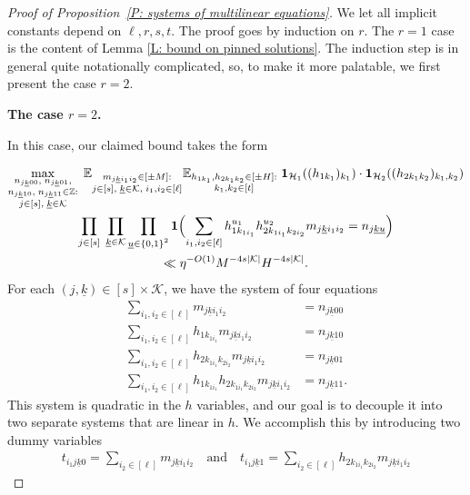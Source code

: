 \documentclass[10pt,a4paper]{amsart}
\newcommand{\Bigbrac}[1]{\Bigl( #1 \Bigr)}
\newcommand{\CH}{{\mathcal H}}
\newcommand{\CK}{{\mathcal K}}
\newcommand{\E}{{\mathbb E}}
\newcommand{\Z}{{\mathbb Z}}
\newcommand{\uk}{{\underline{k}}}
\newcommand{\uu}{{\underline{u}}}
\begin{document}
\begin{proof}[Proof of Proposition~\ref{P: systems of multilinear equations}] We let all implicit constants depend on $\ell, r, s, t$. The proof goes by induction on $r$.  The $r=1$ case is the content of Lemma \ref{L: bound on pinned solutions}.  The induction step is in general quite notationally complicated, so, to make it more palatable, we first present the case $r=2$.

\smallskip
\textbf{The case $r=2$.}
\smallskip

In this case, our claimed bound takes the form

        \begin{multline*}
        \max_{\substack{n_{j\uk00},\; n_{j\uk01},\\ n_{j\uk10},\; n_{j\uk11}\in\Z:\\ j\in[s],\; \uk\in\CK}}\;\E_{\substack{m_{j\uk i_1 i_2}\in[\pm M]:\\ j\in[s],\; \uk\in\CK,\; i_1, i_2\in[\ell]}}
                \E_{\substack{h_{1k_1}, h_{2k_1k_2}\in[\pm H]:\\ k_1, k_2\in[t]}}\; \mathbf{1}_{\CH_1}((h_{1k_1})_{k_1}) \cdot \mathbf{1}_{\CH_2}((h_{2k_1k_2})_{k_1, k_2})\\
        \prod_{j\in[s]}\; \prod_{\substack{\uk\in\CK}}\prod_{\substack{\uu\in\{0,1\}^2
        }} \mathbf{1}\Bigbrac{\sum\limits_{i_1, i_2\in[\ell]} h_{1k_{1i_1}}^{u_1} h_{2k_{1i_1}k_{2i_2}}^{u_2}m_{j\uk i_1 i_2} = n_{j\uk\uu}}\\
        \ll \eta^{-O(1)}  M^{-4s|\CK|} H^{-4s|\CK|}.
    \end{multline*}
    For each $(j,\uk)\in[s]\times \CK$, we have the system of four equations
\begin{align*}
    \sum\limits_{i_1, i_2\in[\ell]} m_{j\uk i_1 i_2} &= n_{j\uk00}\\
    \sum\limits_{i_1, i_2\in[\ell]} h_{1k_{1i_1}} m_{j\uk i_1 i_2} &= n_{j\uk10}\\
    \sum\limits_{i_1, i_2\in[\ell]} h_{2k_{1i_1}k_{2i_2}} m_{j\uk i_1 i_2} &= n_{j\uk01}\\
    \sum\limits_{i_1, i_2\in[\ell]} h_{1k_{1i_1}} h_{2k_{1i_1}k_{2i_2}} m_{j\uk i_1 i_2} &= n_{j\uk11}.
\end{align*}
This system is quadratic in the $h$ variables, and our goal is to decouple it into two separate systems that are linear in $h$. We accomplish this by introducing two dummy variables
\begin{align*}
    t_{i_1 j \uk 0} = \sum_{i_2\in[\ell]}m_{j\uk i_1 i_2}\quad \textrm{and}\quad t_{i_1 j \uk 1} = \sum_{i_2\in[\ell]}h_{2k_{1i_1}k_{2i_2}} m_{j\uk i_1 i_2}

\end{align*}
\end{proof}
\end{document}
